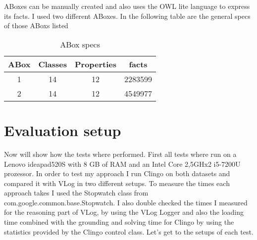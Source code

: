 \documentclass[hyperref, bachelorofscience]{cgvpub}
\begin{document}
ABoxes can be manually created and also uses the OWL lite language to express its facts.
I used two different ABoxes.
In the following table are the general specs of those ABoxs listed


\begin{table}
\centering
\begin{tabular}{|c|c|c|c|}
\hline
ABox & Classes & Properties & facts \\
\hline
\hline
1 & 14 & 12 & 2283599 \\
2 & 14 & 12 & 4549977 \\
\hline
\end{tabular}
\caption{ABox specs}
\end{table}









\section{Evaluation setup}
Now will show how the tests where performed. First all tests where run on a Lenovo ideapad520S with 8 GB of RAM and an Intel Core 2,5GHx2 i5-7200U prozessor.
In order to test my approach I run Clingo on both datasets and compared it with VLog in two different setups. To measure the times each approach takes I used the Stopwatch class from com.google.common.base.Stopwatch. I also double checked the times I measured for the reasoning part of VLog, by using the VLog Logger and also the loading time combined with the grounding and solving time for Clingo by using the statistics provided by the Clingo control class. Let's get to the setups of each test.\\
\end{document}
